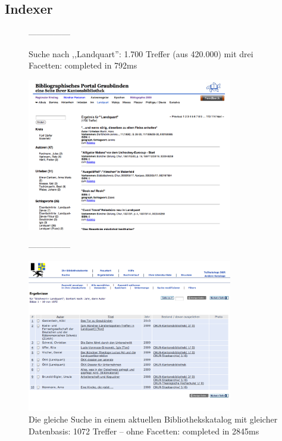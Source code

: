   \subsection{Indexer}
    \renewcommand{\baselinestretch}{1}
    \small
    \begin{figure}
    ---------------
    \caption{Suche nach ,,Landquart'': 1.700 Treffer (aus 420.000) mit drei Facetten: completed in 792ms}
    \begin{center}
        \includegraphics[width=0.8\textwidth]{pics/Ergebnis}
    \end{center}
    
    ---------------
    \caption{Die gleiche Suche in einem aktuellen Bibliothekskatalog mit gleicher Datenbasis: 1072 Treffer -- ohne Facetten: completed in 2845ms}
    \begin{center}
    \includegraphics[width=0.8\textwidth]{pics/aleph}
    \end{center}
    \end{figure}
    
    \renewcommand{\baselinestretch}{1.5}
    \normalsize




